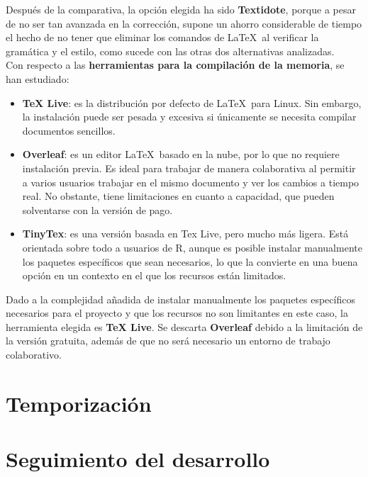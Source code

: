 Después de la comparativa, la opción elegida ha sido \textbf{Textidote}, porque a pesar de 
no ser tan avanzada en la corrección, supone un ahorro considerable de tiempo el hecho de no 
tener que eliminar los comandos de \LaTeX\ al verificar la gramática y el estilo, como sucede
con las otras dos alternativas analizadas.
\\

Con respecto a las \textbf{herramientas para la compilación de la memoria}, se han estudiado:

\begin{itemize}
    \item \textbf{TeX Live}: es la distribución por defecto de \LaTeX\ para Linux. Sin embargo,
    la instalación puede ser pesada y excesiva si únicamente se necesita compilar documentos
    sencillos.
    \item \textbf{Overleaf}: es un editor \LaTeX\ basado en la nube, por lo que no requiere 
    instalación previa. Es ideal para trabajar de manera colaborativa al permitir
    a varios usuarios trabajar en el mismo documento y ver los cambios a tiempo real.
    No obstante, tiene limitaciones en cuanto a capacidad, que pueden solventarse con
    la versión de pago.
    \item \textbf{TinyTex}: es una versión basada en Tex Live, pero mucho más ligera. Está orientada
    sobre todo a usuarios de R, aunque es posible instalar manualmente los paquetes 
    específicos que sean necesarios, lo que la convierte en una buena opción en un contexto 
    en el que los recursos están limitados.
\end{itemize}

Dado a la complejidad añadida de instalar manualmente los paquetes específicos necesarios
para el proyecto y que los recursos no son limitantes en este caso, la herramienta elegida
es \textbf{TeX Live}. Se descarta \textbf{Overleaf} debido a la limitación de la versión gratuita,
además de que no será necesario un entorno de trabajo colaborativo.

\section{Temporización}

\section{Seguimiento del desarrollo}
